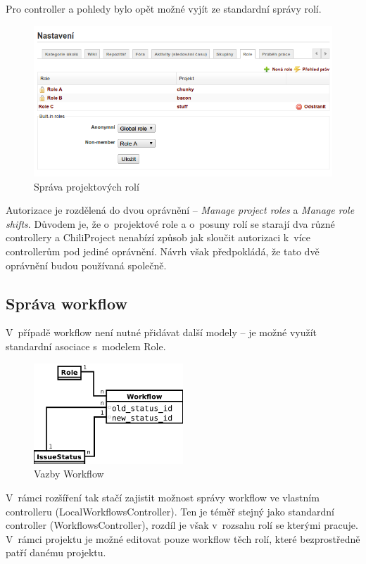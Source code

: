 \documentclass[thesis=B,czech]{FITthesis}[2012/05/02]
\begin{document}
Pro controller a pohledy bylo opět možné vyjít ze standardní správy
rolí.

\begin{figure}[tbp]
\centering
\includegraphics[width=1\textwidth]{role-gui1.png}
\caption{Správa projektových rolí}
\end{figure}

Autorizace je rozdělená do dvou oprávnění -- \emph{Manage project roles} a
\emph{Manage role shifts}. Důvodem je, že o~projektové role a o~posuny rolí
se starají dva různé controllery a ChiliProject nenabízí způsob jak
sloučit autorizaci k~více controllerům pod jediné oprávnění. Návrh však
předpokládá, že tato dvě oprávnění budou používaná společně.

\subsection{Správa workflow}

V~případě \gls{workflow} není nutné přidávat další modely -- je možné
využít standardní asociace s~modelem Role.

\begin{figure}[htbp]
\centering
\includegraphics[width=0.5\textwidth]{role-er3.pdf}
\caption{Vazby Workflow}
\label{fig:Workflow}
\end{figure}

V~rámci rozšíření tak stačí zajistit možnost správy workflow ve vlastním
controlleru (LocalWorkflowsController). Ten je téměř stejný jako
standardní controller (WorkflowsController), rozdíl je však v~rozsahu
rolí se kterými pracuje. V~rámci projektu je možné editovat pouze
workflow těch rolí, které bezprostředně patří danému projektu.
\end{document}

